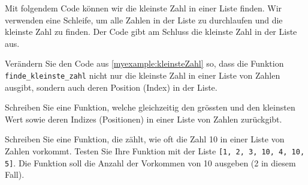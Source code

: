 \begin{myexample}\label{myexample:kleinsteZahl}
	Mit folgendem Code können wir die kleinste Zahl in einer Liste finden. Wir verwenden eine Schleife, um alle Zahlen in der Liste zu durchlaufen und die kleinste Zahl zu finden. Der Code gibt am Schluss die kleinste Zahl in der Liste aus.
	
\end{myexample}


\begin{myexercise}
	Verändern Sie den Code aus \cref{myexample:kleinsteZahl} so, dass die Funktion \lstinline|finde_kleinste_zahl| nicht nur die kleinste Zahl in einer Liste von Zahlen ausgibt, sondern auch deren Position (Index) in der Liste.
	\begin{myanswer}
		
	\end{myanswer}
\end{myexercise}

\begin{myexercise}
	Schreiben Sie eine Funktion, welche gleichzeitig den grössten und den kleinsten Wert sowie deren Indizes (Positionen) in einer Liste von Zahlen zurückgibt.
	\begin{myanswer}
		
	\end{myanswer}
\end{myexercise}

\begin{myexercise}
	Schreiben Sie eine Funktion, die zählt, wie oft die Zahl 10 in einer Liste von Zahlen vorkommt. Testen Sie Ihre Funktion mit der Liste \lstinline|[1, 2, 3, 10, 4, 10, 5]|. Die Funktion soll die Anzahl der Vorkommen von 10 ausgeben (2 in diesem Fall).
	\begin{myanswer}
		
	\end{myanswer}
\end{myexercise}

